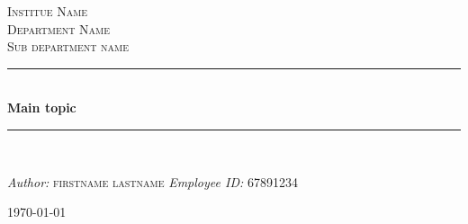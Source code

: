 \begin{titlepage} 
\newcommand{\HRule}{\rule{\linewidth}{0.5mm}} 
\center 
\textsc{\LARGE Institue Name} \\[1.5cm] 
\textsc{\Large Department Name} \\[0.5cm] 
\textsc{\large Sub department name} \\ 
\HRule  \\[0.4cm] 
{ \huge \bfseries Main topic} \\[0.4cm] 
\HRule  \\[1.5cm] 
\begin{minipage}{0.4\textwidth} 
\begin{flushleft} \large 
\emph{Author:} \newline  
\textsc{firstname lastname} 
\emph{Employee ID:} 
\textsc{67891234} 
\end{flushleft} 
\end{minipage} 
\hfill 
\vfill 
{\large \today} 
\end{titlepage}